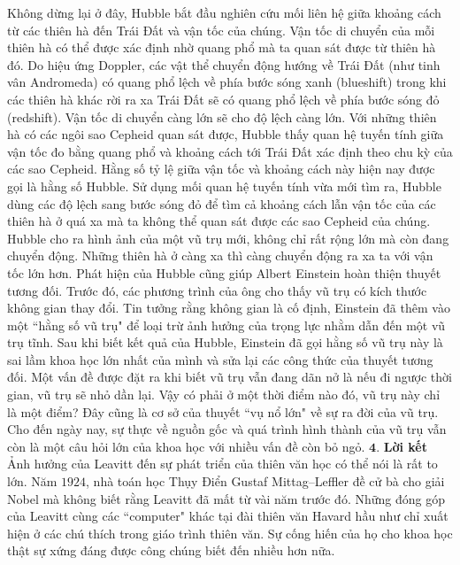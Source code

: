 \begin{multicols}{2}
	Không dừng lại ở đây, Hubble bắt đầu nghiên cứu mối liên hệ giữa khoảng cách từ các thiên hà đến Trái Đất và vận tốc của chúng. Vận tốc di chuyển của mỗi thiên hà có thể được xác định nhờ quang phổ mà ta quan sát được từ thiên hà đó. Do hiệu ứng Doppler, các vật thể chuyển động hướng về Trái Đất (như tinh vân Andromeda) có quang phổ lệch về phía bước sóng xanh (blueshift) trong khi các thiên hà khác rời ra xa Trái Đất sẽ có quang phổ lệch về phía bước sóng đỏ (redshift). Vận tốc di chuyển càng lớn sẽ cho độ lệch càng lớn. Với những thiên hà có các ngôi sao Cepheid quan sát được, Hubble thấy quan hệ tuyến tính giữa vận tốc đo bằng quang phổ và khoảng cách tới Trái Đất xác định theo chu kỳ của các sao Cepheid. Hằng số tỷ lệ giữa vận tốc và khoảng cách này hiện nay được gọi là hằng số Hubble. Sử dụng mối quan hệ tuyến tính vừa mới tìm ra, Hubble dùng các độ lệch sang bước sóng đỏ để tìm cả khoảng cách lẫn vận tốc của các thiên hà ở quá xa mà ta không thể quan sát được các sao Cepheid của chúng. Hubble cho ra hình ảnh của một vũ trụ mới, không chỉ rất rộng lớn  mà còn đang chuyển động. Những thiên hà ở càng xa thì càng chuyển động ra xa ta với vận tốc lớn hơn. Phát hiện của Hubble cũng giúp Albert Einstein hoàn thiện thuyết tương đối. Trước đó, các phương trình của ông cho thấy vũ trụ có kích thước không gian thay đổi. Tin tưởng rằng không gian là cố định, Einstein đã thêm vào một ``hằng số vũ trụ"  để loại trừ ảnh hưởng của trọng lực nhằm dẫn đến một vũ trụ tĩnh. Sau khi biết kết quả của Hubble, Einstein đã gọi hằng số vũ trụ này là sai lầm khoa học lớn nhất của mình và sửa lại các công thức của thuyết tương đối.
	\vskip 0.1cm
	Một vấn đề được đặt ra khi biết vũ trụ vẫn đang dãn nở là nếu đi ngược thời gian, vũ trụ sẽ nhỏ dần lại. Vậy có phải ở một thời điểm nào đó, vũ trụ này chỉ là một điểm?  Đây cũng là cơ sở của thuyết ``vụ nổ lớn" về sự ra đời của vũ trụ. Cho đến ngày nay, sự thực về nguồn gốc và quá trình hình thành của vũ trụ vẫn còn là một câu hỏi lớn của khoa học với nhiều vấn đề còn bỏ ngỏ.
	\vskip 0.1cm
	$\pmb{4.}$ \textbf{\color{timhieukhoahoc}Lời kết}
	\vskip 0.1cm
	Ảnh hưởng của Leavitt đến sự phát triển của thiên văn học có thể nói là rất to lớn. Năm $1924$, nhà toán học Thụy Điển  Gustaf Mittag--Leffler đề cử bà cho giải Nobel mà không biết rằng Leavitt đã mất từ vài năm trước đó. Những đóng góp của Leavitt cùng các ``computer" khác tại đài thiên văn Havard hầu như chỉ xuất hiện ở các chú thích trong giáo trình thiên văn. Sự cống hiến của họ cho khoa học thật sự xứng đáng được công chúng biết đến nhiều hơn nữa.
	\begin{figure}[H]

\end{figure}
\end{multicols}
